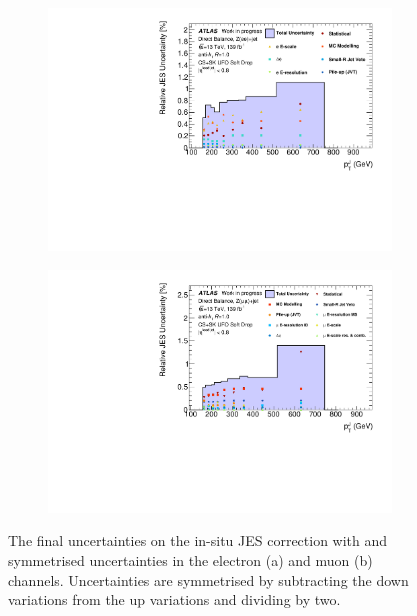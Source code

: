 \begin{figure}[t]
\centering
\begin{subfigure}[b]{\textwidth}
    \centering
    \includegraphics[width=\textwidth]{plots/insitu/systtotal_zee_WIP.pdf}
    \caption{\vspace{20pt}}
\end{subfigure}
\hfill
\begin{subfigure}[b]{\textwidth}
    \centering
    \includegraphics[width=\textwidth]{plots/insitu/systtotal_zmm_WIP.pdf}
    \caption{}
\end{subfigure}
\caption{The final uncertainties on the in-situ JES correction with \ptJ and symmetrised uncertainties in the electron (a) and muon (b) channels. Uncertainties are symmetrised by subtracting the down variations from the up variations and dividing by two.\label{fig:insitu:systs}}
\end{figure}

